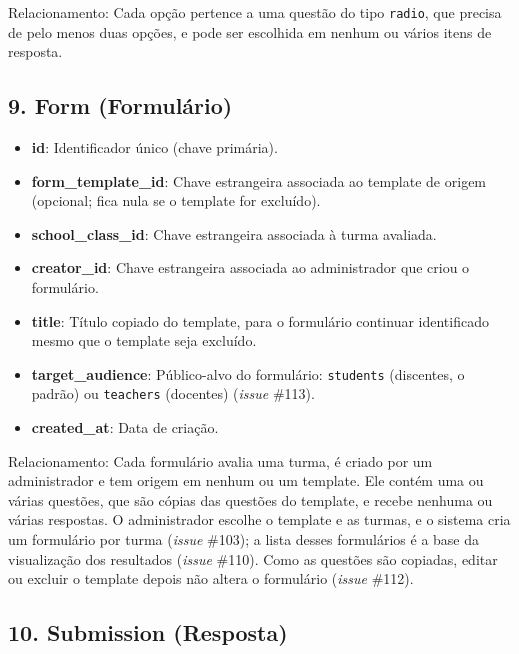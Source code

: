 \documentclass[a4paper,12pt]{article}
\begin{document}
Relacionamento: Cada opção pertence a uma questão do tipo \texttt{radio}, que precisa de pelo menos duas opções, e pode ser escolhida em nenhum ou vários itens de resposta.

\subsection*{9. Form (Formulário)}

\begin{itemize}

    \item \textbf{id}: Identificador único (chave primária).

    \item \textbf{form\_template\_id}: Chave estrangeira associada ao template de origem (opcional; fica nula se o template for excluído).

    \item \textbf{school\_class\_id}: Chave estrangeira associada à turma avaliada.

    \item \textbf{creator\_id}: Chave estrangeira associada ao administrador que criou o formulário.

    \item \textbf{title}: Título copiado do template, para o formulário continuar identificado mesmo que o template seja excluído.

    \item \textbf{target\_audience}: Público-alvo do formulário: \texttt{students} (discentes, o padrão) ou \texttt{teachers} (docentes) (\textit{issue} \#113).

    \item \textbf{created\_at}: Data de criação.

\end{itemize}

Relacionamento: Cada formulário avalia uma turma, é criado por um administrador e tem origem em nenhum ou um template. Ele contém uma ou várias questões, que são cópias das questões do template, e recebe nenhuma ou várias respostas. O administrador escolhe o template e as turmas, e o sistema cria um formulário por turma (\textit{issue} \#103); a lista desses formulários é a base da visualização dos resultados (\textit{issue} \#110). Como as questões são copiadas, editar ou excluir o template depois não altera o formulário (\textit{issue} \#112).

\subsection*{10. Submission (Resposta)}
\end{document}
